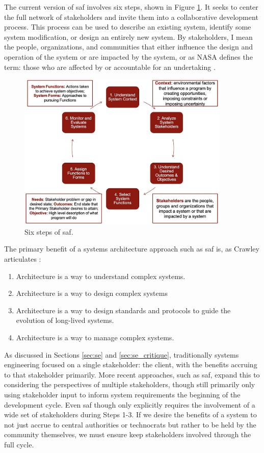 The current version of \ac{saf} involves six steps, shown in Figure \ref{fig:saf}. It seeks to center the full network of stakeholders and invite them into a collaborative development process. This process can be used to describe an existing system, identify some system modification, or design an entirely new system. By stakeholders, I mean the people, organizations, and communities that either influence the design and operation of the system or are impacted by the system, or as NASA defines the term: those who are affected by or accountable for an undertaking \cite{nasaofficeofthechiefengineerNASASystemsEngineering2004}. 

\begin{figure}[!htb] 
\centering
\includegraphics[width=0.9\textwidth]{Figures/chap3/SAF.jpg}
\caption[Six steps of SAF]{Six steps of \ac{saf}.}
\label{fig:saf}
\end{figure}

The primary benefit of a systems architecture approach such as \ac{saf} is, as Crawley articulates
\cite{crawley2004}:

\begin{enumerate}[itemsep=0pt,parsep=0pt]
	\item{Architecture is a way to understand complex systems.}
	\item{Architecture is a way to design complex systems}
	\item{Architecture is a way to design standards and protocols to guide the evolution of long-lived systems.}
	\item{Architecture is a way to manage complex systems.}
\end{enumerate}

As discussed in Sections \ref{sec:se} and \ref{sec:se_critique}, traditionally systems engineering focused on a single stakeholder: the client, with the benefits accruing to that stakeholder primarily. More recent approaches, such as \ac{saf}, expand this to considering the perspectives of multiple stakeholders, though still primarily only using stakeholder input to inform system requirements the beginning of the development cycle. Even \ac{saf} though only explicitly requires the involvement of a wide set of stakeholders during Steps 1-3. If we desire the benefits of a system to not just accrue to central authorities or technocrats but rather to be held by the community themselves, we must ensure keep stakeholders involved through the full cycle.

